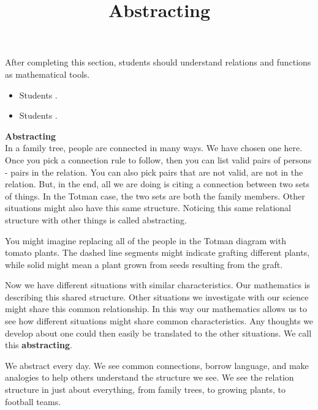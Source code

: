 \documentclass{ximera}
\title{Abstracting}
\begin{document}
\begin{abstract}
\end{abstract}

\maketitle

\begin{sectionOutcomes}

After completing this section, students should understand relations and functions as mathematical tools. 

\begin{itemize}
\item Students .
\item Students .
\end{itemize}

\end{sectionOutcomes}




\textbf{Abstracting} \\
In a family tree, people are connected in many ways.  We have chosen one here. Once you pick a connection rule to follow, then you can list valid pairs of persons - pairs in the relation.  You can also pick pairs that are not valid, are not in the relation.  But, in the end, all we are doing is citing a connection between two sets of things.  In the Totman case, the two sets are both the family members. Other situations might also have this same structure. Noticing this same relational structure with other things is called abstracting.

You might imagine replacing all of the people in the Totman diagram with tomato plants.  The dashed line segments might indicate grafting different plants, while solid might mean a plant grown from seeds resulting from the graft. 

Now we have different situations with similar characteristics. Our mathematics is describing this shared structure. Other situations we investigate with our science might share this common relationship.  In this way our mathematics allows us to see how different situations might share common characteristics. Any thoughts we develop about one could then easily be translated to the other situations. We call this \textbf{abstracting}.

We abstract every day.  We see common connections, borrow language, and make analogies to help others understand the structure we see. We see the relation structure in just about everything, from family trees, to growing plants, to football teams. 
\end{document}

